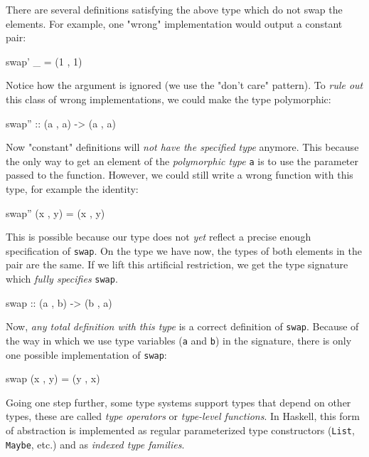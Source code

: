             There are several definitions satisfying the above type which do not swap the elements.
            For example, one "wrong" implementation would output a constant pair:
            \begin{haskellcode}
        swap' _ = (1 , 1)
            \end{haskellcode}

            Notice how the argument is ignored (we use the "don't care" pattern).
            To \emph{rule out} this class of wrong implementations, we could make the type polymorphic:
            \begin{haskellcode}
        swap'' :: (a , a) -> (a , a)
            \end{haskellcode}

            Now "constant" definitions will \emph{not have the specified type} anymore.
            This because the only way to get an element of the \emph{polymorphic type} \texttt{a}
            is to use the parameter passed to the function.
            However, we could still write a wrong function with this type, for example the identity:
            \begin{haskellcode}
        swap'' (x , y) = (x , y)
            \end{haskellcode}

            This is possible because our type does not \emph{yet} reflect a precise enough specification of \texttt{swap}.
            On the type we have now, the types of both elements in the pair are the same.
            If we lift this artificial restriction, we get the type signature which \emph{fully specifies} \texttt{swap}.
            \begin{haskellcode}
        swap :: (a , b) -> (b , a)
            \end{haskellcode}

            Now, \emph{any total definition with this type} is a correct definition of \texttt{swap}.
            Because of the way in which we use type variables (\texttt{a} and \texttt{b}) in the signature,
            there is only one possible implementation of \texttt{swap}:
            \begin{haskellcode}
        swap (x , y) = (y , x)
            \end{haskellcode}

            Going one step further, some type systems support types that depend on other types, these are
            called \emph{type operators} or \emph{type-level functions}.
            In Haskell, this form of abstraction is implemented as regular parameterized type constructors
            (\texttt{List}, \texttt{Maybe}, etc.) and as \emph{indexed type families}.

